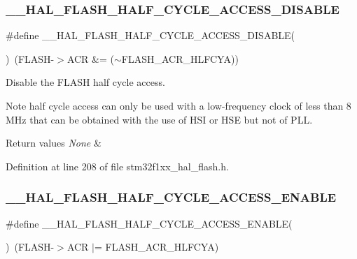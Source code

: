 \subsubsection{\texorpdfstring{\+\_\+\+\_\+\+H\+A\+L\+\_\+\+F\+L\+A\+S\+H\+\_\+\+H\+A\+L\+F\+\_\+\+C\+Y\+C\+L\+E\+\_\+\+A\+C\+C\+E\+S\+S\+\_\+\+D\+I\+S\+A\+B\+LE}{\_\_HAL\_FLASH\_HALF\_CYCLE\_ACCESS\_DISABLE}}
{\footnotesize\ttfamily \#define \+\_\+\+\_\+\+H\+A\+L\+\_\+\+F\+L\+A\+S\+H\+\_\+\+H\+A\+L\+F\+\_\+\+C\+Y\+C\+L\+E\+\_\+\+A\+C\+C\+E\+S\+S\+\_\+\+D\+I\+S\+A\+B\+LE(\begin{DoxyParamCaption}{ }\end{DoxyParamCaption})~(F\+L\+A\+SH-\/$>$A\+CR \&= ($\sim$F\+L\+A\+S\+H\+\_\+\+A\+C\+R\+\_\+\+H\+L\+F\+C\+YA))}



Disable the F\+L\+A\+SH half cycle access. 

\begin{DoxyNote}{Note}
half cycle access can only be used with a low-\/frequency clock of less than 8 M\+Hz that can be obtained with the use of H\+SI or H\+SE but not of P\+LL. 
\end{DoxyNote}

\begin{DoxyRetVals}{Return values}
{\em None} & \\
\hline
\end{DoxyRetVals}


Definition at line 208 of file stm32f1xx\+\_\+hal\+\_\+flash.\+h.

\mbox{\label{group___f_l_a_s_h___half___cycle_ga65eb4c393cbc94747449b8aab349200a}} 
\subsubsection{\texorpdfstring{\+\_\+\+\_\+\+H\+A\+L\+\_\+\+F\+L\+A\+S\+H\+\_\+\+H\+A\+L\+F\+\_\+\+C\+Y\+C\+L\+E\+\_\+\+A\+C\+C\+E\+S\+S\+\_\+\+E\+N\+A\+B\+LE}{\_\_HAL\_FLASH\_HALF\_CYCLE\_ACCESS\_ENABLE}}
{\footnotesize\ttfamily \#define \+\_\+\+\_\+\+H\+A\+L\+\_\+\+F\+L\+A\+S\+H\+\_\+\+H\+A\+L\+F\+\_\+\+C\+Y\+C\+L\+E\+\_\+\+A\+C\+C\+E\+S\+S\+\_\+\+E\+N\+A\+B\+LE(\begin{DoxyParamCaption}{ }\end{DoxyParamCaption})~(F\+L\+A\+SH-\/$>$A\+CR $\vert$= F\+L\+A\+S\+H\+\_\+\+A\+C\+R\+\_\+\+H\+L\+F\+C\+YA)}



